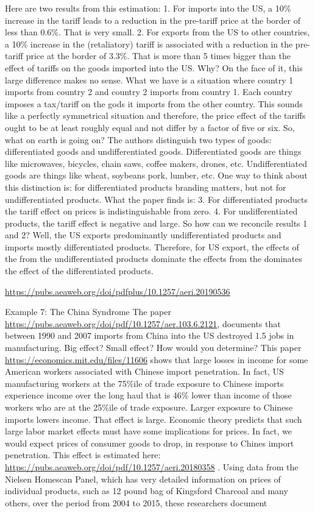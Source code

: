 \documentclass[
]{book}
\begin{document}
Here are two results from this estimation:
1. For imports into the US, a 10\% increase in the tariff leads to a reduction in the pre-tariff price at the border of less than 0.6\%. That is very small.
2. For exports from the US to other countries, a 10\% increase in the (retaliatory) tariff is associated with a reduction in the pre-tariff price at the border of 3.3\%. That is more than 5 times bigger than the effect of tariffs on the goods imported into the US.
Why? On the face of it, this large difference makes no sense.
What we have is a situation where country 1 imports from country 2 and country 2 imports from country 1. Each country imposes a tax/tariff on the gods it imports from the other country. This sounds like a perfectly symmetrical situation and therefore, the price effect of the tariffs ought to be at least roughly equal and not differ by a factor of five or six.
So, what on earth is going on?
The authors distinguish two types of goods: differentiated goods and undifferentiated goods. Differentiated goods are things like microwaves, bicycles, chain saws, coffee makers, drones, etc. Undifferentiated goods are things like wheat, soybeans pork, lumber, etc. One way to think about this distinction is: for differentiated products branding matters, but not for undifferentiated products.
What the paper finds is:
3. For differentiated products the tariff effect on prices is indistinguishable from zero.
4. For undifferentiated products, the tariff effect is negative and large.
So how can we reconcile results 1 and 2? Well, the US exports predominantly undifferentiated products and imports mostly differentiated products. Therefore, for US export, the effects of the from the undifferentiated products dominate the effects from the dominates the effect of the differentiated products.

\url{https://pubs.aeaweb.org/doi/pdfplus/10.1257/aeri.20190536}

Example 7: The China Syndrome
The paper \url{https://pubs.aeaweb.org/doi/pdf/10.1257/aer.103.6.2121}, documents that between 1990 and 2007 imports from China into the US destroyed 1.5 jobs in manufacturing. Big effect? Small effect? How would you determine?
This paper \url{https://economics.mit.edu/files/11606} shows that large losses in income for some American workers associated with Chinese import penetration. In fact, US manufacturing workers at the 75\%ile of trade exposure to Chinese imports experience income over the long haul that is 46\% lower than income of those workers who are at the 25\%ile of trade exposure. Larger exposure to Chinese imports lowers income. That effect is large.
Economic theory predicts that such large labor market effects must have some implications for prices. In fact, we would expect prices of consumer goods to drop, in response to Chines import penetration.
This effect is estimated here: \url{https://pubs.aeaweb.org/doi/pdf/10.1257/aeri.20180358} . Using data from the Nielsen Homescan Panel, which has very detailed information on prices of individual products, such as 12 pound bag of Kingsford Charcoal and many others, over the period from 2004 to 2015, these researchers document
\end{document}
